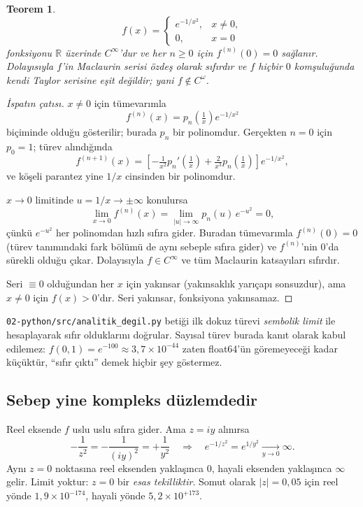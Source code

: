 \documentclass[11pt,a4paper]{article}
\theoremstyle{plain}
\newtheorem{teorem}{Teorem}[section]
\theoremstyle{definition}
\theoremstyle{remark}
\newcommand{\R}{\mathbb{R}}
\begin{document}
\begin{teorem}\label{teorem:e-1x2}
\[
  f(x) = \begin{cases} e^{-1/x^2}, & x \neq 0,\\ 0, & x = 0\end{cases}
\]
fonksiyonu $\R$ üzerinde $C^\infty$'dur ve her $n \ge 0$ için $f^{(n)}(0) = 0$
sağlanır. Dolayısıyla $f$'in Maclaurin serisi özdeş olarak sıfırdır ve $f$
hiçbir $0$ komşuluğunda kendi Taylor serisine eşit değildir; yani
$f \notin C^\omega$.
\end{teorem}

\begin{proof}[İspatın çatısı]
$x \neq 0$ için tümevarımla
\[
  f^{(n)}(x) = p_n\!\left(\tfrac1x\right) e^{-1/x^2}
\]
biçiminde olduğu gösterilir; burada $p_n$ bir polinomdur. Gerçekten $n=0$ için
$p_0 = 1$; türev alındığında
\[
  f^{(n+1)}(x) = \left[-\tfrac{1}{x^2}p_n'\!\left(\tfrac1x\right)
  + \tfrac{2}{x^3}p_n\!\left(\tfrac1x\right)\right] e^{-1/x^2},
\]
ve köşeli parantez yine $1/x$ cinsinden bir polinomdur.

$x \to 0$ limitinde $u = 1/x \to \pm\infty$ konulursa
\[
  \lim_{x\to 0} f^{(n)}(x) = \lim_{|u|\to\infty} p_n(u)\,e^{-u^2} = 0,
\]
çünkü $e^{-u^2}$ her polinomdan hızlı sıfıra gider. Buradan tümevarımla
$f^{(n)}(0) = 0$ (türev tanımındaki fark bölümü de aynı sebeple sıfıra gider)
ve $f^{(n)}$'nin $0$'da sürekli olduğu çıkar. Dolayısıyla $f \in C^\infty$ ve
tüm Maclaurin katsayıları sıfırdır.

Seri $\equiv 0$ olduğundan her $x$ için yakınsar (yakınsaklık yarıçapı
sonsuzdur), ama $x \neq 0$ için $f(x) > 0$'dır. Seri yakınsar, fonksiyona
yakınsamaz.
\end{proof}

\texttt{02-python/src/analitik\_degil.py} betiği ilk dokuz türevi
\emph{sembolik limit} ile hesaplayarak sıfır olduklarını doğrular. Sayısal
türev burada kanıt olarak kabul edilemez: $f(0{,}1) = e^{-100} \approx
3{,}7\times 10^{-44}$ zaten float64'ün göremeyeceği kadar küçüktür, ``sıfır
çıktı'' demek hiçbir şey göstermez.

\subsection*{Sebep yine kompleks düzlemdedir}

Reel eksende $f$ uslu uslu sıfıra gider. Ama $z = iy$ alınırsa
\[
  -\frac{1}{z^2} = -\frac{1}{(iy)^2} = +\frac{1}{y^2}
  \quad\Longrightarrow\quad
  e^{-1/z^2} = e^{1/y^2} \xrightarrow[y\to 0]{} \infty .
\]
Aynı $z=0$ noktasına reel eksenden yaklaşınca $0$, hayali eksenden yaklaşınca
$\infty$ gelir. Limit yoktur: $z=0$ bir \emph{esas tekilliktir}. Somut olarak
$|z| = 0{,}05$ için reel yönde $1{,}9\times 10^{-174}$, hayali yönde
$5{,}2\times 10^{+173}$.
\end{document}
